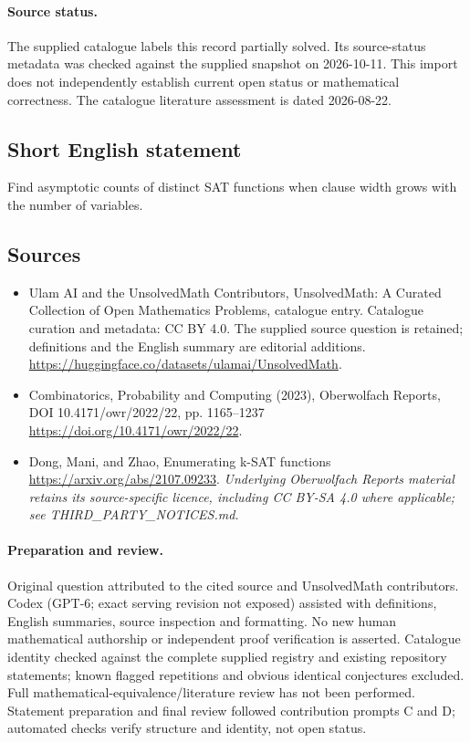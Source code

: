 \documentclass[11pt]{article}
\begin{document}
\paragraph{Source status.}
The supplied catalogue labels this record partially solved. Its source-status metadata was checked against the supplied snapshot on 2026-10-11. This import does not independently establish current open status or mathematical correctness. The catalogue literature assessment is dated 2026-08-22.
\subsection{Short English statement}
Find asymptotic counts of distinct SAT functions when clause width grows with the number of variables.
\subsection{Sources}
\begin{itemize}
\item[S1] Ulam AI and the UnsolvedMath Contributors, UnsolvedMath: A Curated Collection of Open Mathematics Problems, catalogue entry. Catalogue curation and metadata: CC BY 4.0. The supplied source question is retained; definitions and the English summary are editorial additions.
\url{https://huggingface.co/datasets/ulamai/UnsolvedMath}.
\item[S2] Combinatorics, Probability and Computing (2023), Oberwolfach Reports, DOI 10.4171/owr/2022/22, pp. 1165--1237
\url{https://doi.org/10.4171/owr/2022/22}.
\item[S3] Dong, Mani, and Zhao, Enumerating k-SAT functions
\url{https://arxiv.org/abs/2107.09233}.
\textit{Underlying Oberwolfach Reports material retains its source-specific licence, including CC BY-SA 4.0 where applicable; see THIRD\_PARTY\_NOTICES.md.}
\end{itemize}
\paragraph{Preparation and review.}
Original question attributed to the cited source and UnsolvedMath contributors. Codex (GPT-6; exact serving revision not exposed) assisted with definitions, English summaries, source inspection and formatting. No new human mathematical authorship or independent proof verification is asserted. Catalogue identity checked against the complete supplied registry and existing repository statements; known flagged repetitions and obvious identical conjectures excluded. Full mathematical-equivalence/literature review has not been performed. Statement preparation and final review followed contribution prompts C and D; automated checks verify structure and identity, not open status.
\label{end:statement}
\end{document}

